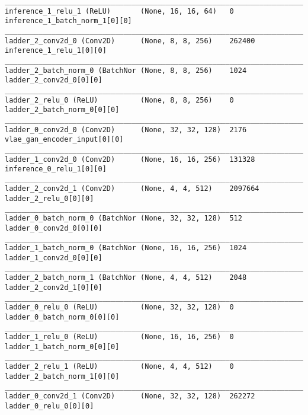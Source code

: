 \begin{lstlisting}[caption={\textsc{Mnist}-\ac{VLAE}-\ac{GAN} Encoder},captionpos=b,basicstyle=\tiny, label={lst:mnist-vlae-gan-encoder}]
__________________________________________________________________________________________________
inference_1_relu_1 (ReLU)       (None, 16, 16, 64)   0           inference_1_batch_norm_1[0][0]
__________________________________________________________________________________________________
ladder_2_conv2d_0 (Conv2D)      (None, 8, 8, 256)    262400      inference_1_relu_1[0][0]
__________________________________________________________________________________________________
ladder_2_batch_norm_0 (BatchNor (None, 8, 8, 256)    1024        ladder_2_conv2d_0[0][0]
__________________________________________________________________________________________________
ladder_2_relu_0 (ReLU)          (None, 8, 8, 256)    0           ladder_2_batch_norm_0[0][0]
__________________________________________________________________________________________________
ladder_0_conv2d_0 (Conv2D)      (None, 32, 32, 128)  2176        vlae_gan_encoder_input[0][0]
__________________________________________________________________________________________________
ladder_1_conv2d_0 (Conv2D)      (None, 16, 16, 256)  131328      inference_0_relu_1[0][0]
__________________________________________________________________________________________________
ladder_2_conv2d_1 (Conv2D)      (None, 4, 4, 512)    2097664     ladder_2_relu_0[0][0]
__________________________________________________________________________________________________
ladder_0_batch_norm_0 (BatchNor (None, 32, 32, 128)  512         ladder_0_conv2d_0[0][0]
__________________________________________________________________________________________________
ladder_1_batch_norm_0 (BatchNor (None, 16, 16, 256)  1024        ladder_1_conv2d_0[0][0]
__________________________________________________________________________________________________
ladder_2_batch_norm_1 (BatchNor (None, 4, 4, 512)    2048        ladder_2_conv2d_1[0][0]
__________________________________________________________________________________________________
ladder_0_relu_0 (ReLU)          (None, 32, 32, 128)  0           ladder_0_batch_norm_0[0][0]
__________________________________________________________________________________________________
ladder_1_relu_0 (ReLU)          (None, 16, 16, 256)  0           ladder_1_batch_norm_0[0][0]
__________________________________________________________________________________________________
ladder_2_relu_1 (ReLU)          (None, 4, 4, 512)    0           ladder_2_batch_norm_1[0][0]
__________________________________________________________________________________________________
ladder_0_conv2d_1 (Conv2D)      (None, 32, 32, 128)  262272      ladder_0_relu_0[0][0]

\end{lstlisting}
